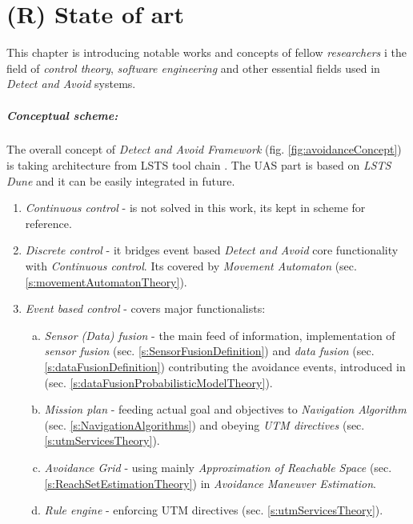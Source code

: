 \setcounter{chapter}{4}
\chapter{(R) State of art}\label{ch:stateOfArt}

\noindent This  chapter is introducing notable works and concepts of fellow \emph{researchers} i the field of \emph{control theory}, \emph{software engineering} and other essential fields used in \emph{Detect and Avoid} systems.

\paragraph{Conceptual scheme:} The overall concept of \emph{Detect and Avoid Framework} (fig. \ref{fig:avoidanceConcept}) is taking architecture from LSTS tool chain \cite{pinto2013lsts,pinto2012implementation}. The UAS part is based on \emph{LSTS Dune} and it can be easily integrated in future. 

\begin{enumerate}
    \item \emph{Continuous control} - is not solved in this work, its kept in scheme for reference. 
    
    \item \emph{Discrete control} - it bridges event based \emph{Detect and Avoid} core functionality with \emph{Continuous control}. Its covered by \emph{Movement Automaton} (sec. \ref{s:movementAutomatonTheory}).
    
    \item \emph{Event based control} - covers major functionalists:    
    \begin{enumerate}[a.]
        \item \emph{Sensor (Data) fusion} - the main feed of information, implementation of \emph{sensor fusion} (sec. \ref{s:SensorFusionDefinition}) and \emph{data fusion} (sec. \ref{s:dataFusionDefinition}) contributing the avoidance events, introduced in (sec. \ref{s:dataFusionProbabilisticModelTheory}).
        
        \item \emph{Mission plan} - feeding actual goal and objectives to \emph{Navigation Algorithm} (sec. \ref{s:NavigationAlgorithms}) and obeying \emph{UTM directives} (sec. \ref{s:utmServicesTheory}).
        
        \item \emph{Avoidance Grid}  - using mainly \emph{Approximation of Reachable Space} (sec. \ref{s:ReachSetEstimationTheory}) in \emph{Avoidance Maneuver Estimation}.
        
        \item \emph{Rule engine} - enforcing UTM directives (sec. \ref{s:utmServicesTheory}).
    \end{enumerate}
    
\end{enumerate}

